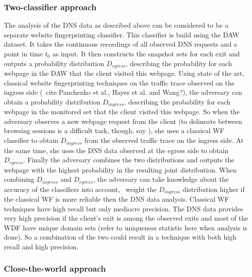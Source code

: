 \subsubsection{Two-classifier approach}

The analysis of the DNS data as described above can be considered to be
a separate website fingerprinting classifier. This classifier is build
using the DAW dataset. It takes the continuous recordings of all
observed DNS requests and a point in time $t_0$ as input. It then
constructs the snapshot sets for each exit and outputs a probability
distribution $D_{egress}$, describing the probability for each webpage
in the DAW that the client visited this webpage.
%
Using state of the art, classical website fingerprinting techniques on
the traffic trace observed on the ingress side (\eg~cite Panchenko et
al., Hayes et al. and Wang?), the adversary can obtain a probability
distribution $D_{ingress}$, describing the probability for each webpage
in the monitored set that the client visited this webpage.
%
So when the adversary observes a new webpage request from the client (to
delineate between browsing sessions is a difficult task, though, say
\cite{Coull2007a}), she uses a classical WF classifier to obtain
$D_{ingress}$ from the observed traffic trace on the ingress side. At
the same time, she uses the DNS data observed at the egress side to
obtain $D_{egress}$. Finally the adversary combines the two
distributions and outputs the webpage with the highest probability in
the resulting joint distribution.
%
When combining $D_{ingress}$ and $D_{egress}$, the adversary can take
knowledge about the accuracy of the classifiers into account, \eg~weight
the $D_{ingress}$ distribution higher if the classical WF is more
reliable then the DNS data analysis.
%
Classical WF techniques have high recall but only mediocre precision.
The DNS data provides very high precision if the client's exit is among
the observed exits and most of the WDF have unique domain sets (refer to
uniqueness statistic here when analysis is done). So a combination of
the two could result in a technique with both high recall and high
precision.


\subsubsection{Close-the-world approach}

